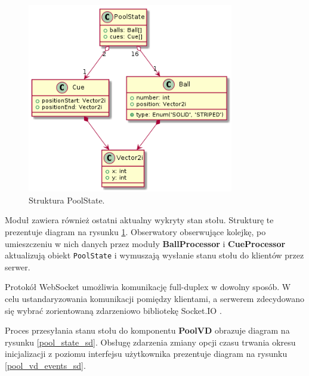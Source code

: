 \documentclass[12pt]{article}
\begin{document}
\begin{figure}[!htb]
    \centering
    \includegraphics[width=9cm]{./diagrams/out/pull_state_cd.png}
    \caption{Struktura PoolState.}
    \label{poolstate}
\end{figure}

Moduł zawiera również ostatni aktualny wykryty stan stołu. Strukturę te prezentuje diagram na rysunku \ref{poolstate}.
Obserwatory obserwujące kolejkę, po umieszczeniu w nich danych przez moduły \textbf{BallProcessor} i \textbf{CueProcessor} aktualizują obiekt \lstinline{PoolState} i wymuszają wysłanie stanu stołu do klientów przez serwer.

Protokół WebSocket umożliwia komunikację full-duplex w dowolny sposób. W celu ustandaryzowania komunikacji pomiędzy klientami, a serwerem zdecydowano się wybrać zorientowaną zdarzeniowo bibliotekę Socket.IO \cite{socket.io}.

Proces przesyłania stanu stołu do komponentu \textbf{PoolVD} obrazuje diagram na rysunku \ref{pool_state_sd}. Obsługę zdarzenia zmiany opcji czasu trwania okresu inicjalizacji z poziomu interfejsu użytkownika prezentuje diagram na rysunku \ref{pool_vd_events_sd}.
\end{document}
